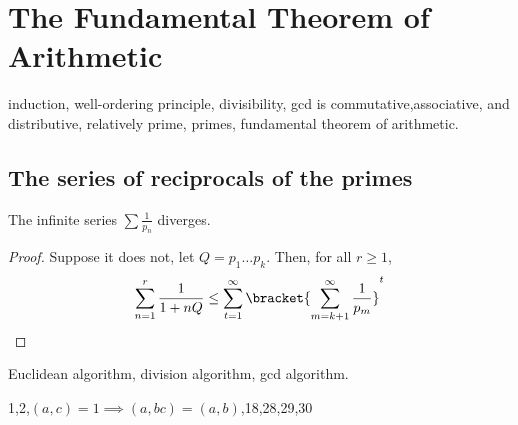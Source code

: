 \chapter{The Fundamental Theorem of Arithmetic}
induction, well-ordering principle, divisibility, gcd is commutative,associative, and distributive, relatively prime, primes, fundamental theorem of arithmetic.
\section{The series of reciprocals of the primes}
\begin{theorem}
    The infinite series \(\sum \frac{1}{p_n}\) diverges.
\end{theorem}
\begin{proof}
    Suppose it does not, let \(Q = p_1 \dots p_k\). Then, for all \(r \geq 1\), 
    \begin{equation*}
        \sum_{n = 1}^r \dfrac{1}{1 + nQ} \leq \sum_{t =1}^{\infty} \bracket{\sum_{m = k + 1}^{\infty} \frac{1}{p_m}}^t
    \end{equation*}
\end{proof}
Euclidean algorithm, division algorithm, gcd algorithm.
\begin{exercise}
    \item 1,2,\((a,c) = 1 \implies (a,bc) = (a,b)\),18,28,29,30
\end{exercise}